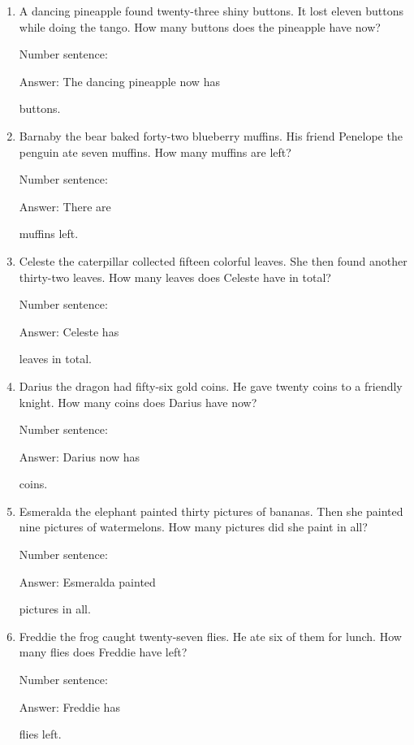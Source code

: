 \documentclass{tufte-book}
\begin{document}
\begin{enumerate}

\item
  A dancing pineapple found twenty-three shiny buttons. It lost eleven
  buttons while doing the tango. How many buttons does the pineapple
  have now?\medskip\par
  Number sentence:
  \dotfill\medskip\par
  Answer: The dancing pineapple now has
  \dotfill\medskip\par\mbox{}\dotfill\medskip\par\mbox{}\dotfill\bigskip
  buttons.
\item
  Barnaby the bear baked forty-two blueberry muffins. His friend
  Penelope the penguin ate seven muffins. How many muffins are left?\medskip\par
  Number sentence:
  \dotfill\medskip\par
  Answer: There are
  \dotfill\medskip\par\mbox{}\dotfill\medskip\par\mbox{}\dotfill\bigskip
  muffins left.
\item
  Celeste the caterpillar collected fifteen colorful leaves. She then
  found another thirty-two leaves. How many leaves does Celeste have in
  total?\medskip\par
  Number sentence:
  \dotfill\medskip\par
  Answer: Celeste has
  \dotfill\medskip\par\mbox{}\dotfill\medskip\par\mbox{}\dotfill\bigskip
  leaves in total.
\item
  Darius the dragon had fifty-six gold coins. He gave twenty coins to a
  friendly knight. How many coins does Darius have now?\medskip\par
  Number sentence:
  \dotfill\medskip\par
  Answer: Darius now has
  \dotfill\medskip\par\mbox{}\dotfill\medskip\par\mbox{}\dotfill\bigskip
  coins.
\item
  Esmeralda the elephant painted thirty pictures of bananas. Then she
  painted nine pictures of watermelons. How many pictures did she paint
  in all?\medskip\par
  Number sentence:
  \dotfill\medskip\par
  Answer: Esmeralda painted
  \dotfill\medskip\par\mbox{}\dotfill\medskip\par\mbox{}\dotfill\bigskip
  pictures in all.
\item
  Freddie the frog caught twenty-seven flies. He ate six of them for
  lunch. How many flies does Freddie have left?\medskip\par
  Number sentence:
  \dotfill\medskip\par
  Answer: Freddie has
  \dotfill\medskip\par\mbox{}\dotfill\medskip\par\mbox{}\dotfill\bigskip
  flies left.
\end{enumerate}
\end{document}
